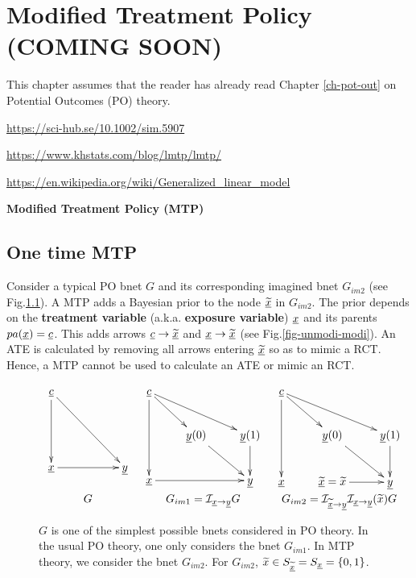 \chapter{Modified Treatment Policy (COMING SOON)}
\label{ch-modi-treat}

This  chapter
assumes that the
reader has
already read
Chapter \ref{ch-pot-out} on Potential Outcomes (PO) theory.


\url{https://sci-hub.se/10.1002/sim.5907}

\url{https://www.khstats.com/blog/lmtp/lmtp/}

\url{https://en.wikipedia.org/wiki/Generalized_linear_model}


\cite{hernan-book}

{\bf Modified Treatment Policy (MTP)}

\section{One time MTP}
Consider a typical PO bnet $G$
and its corresponding imagined bnet $G_{im2}$ (see Fig.\ref{fig-modi-po}).
A MTP adds a Bayesian prior to the
 node $\underline{{\widetilde{x}}}$ in $G_{im2}$.
The prior depends on the {\bf treatment
variable} (a.k.a. {\bf exposure variable}) ${\underline{x}}$ and its parents $pa({\underline{x}})={\underline{c}}$.
This adds arrows ${\underline{c}}\rightarrow\underline{{\widetilde{x}}}$
and ${\underline{x}}\rightarrow \underline{{\widetilde{x}}}$ (see Fig.\ref{fig-unmodi-modi}).
An ATE is calculated by removing all arrows entering $\underline{{\widetilde{x}}}$
so as to mimic a RCT. Hence, a MTP cannot be used to calculate
an ATE or mimic an RCT.


\begin{figure}[h!]
$$
\begin{array}{ccc}
\xymatrix{
\rvc
\ar[dd]\ar[ddrr]
\\
\\
\rvx \ar[rr]
&
&\rvy
}
&
\xymatrix{
\rvc
\ar[dd]\ar[dr] \ar[drr]
\\
& \rvy(0)\ar[dr]
&\rvy(1)\ar[d]
\\
\rvx\ar[rr]
&
&\rvy
}
&
\xymatrix{
\rvc
\ar[dd]\ar[dr] \ar[drr]
\\
& \rvy(0)\ar[dr]
&\rvy(1)\ar[d]
\\
\rvx
&\ul{\tilx}=\tilx\ar[r]
&\rvy
}
\\
G
&G_{im1} =\cali_{\rvx\rarrow\rvy} G
& G_{im2}=\cali_{\ul{\tilx}\rarrow\rvy}\cali_{\rvx\rarrow\rvy}(\tilx)G
\end{array}
$$
\caption{$G$ is one of the
simplest possible bnets considered in  PO theory.
In the usual PO theory,
one only considers the bnet $G_{im1}$.
In MTP theory, we
consider the bnet $G_{im2}$.
For $G_{im2}$, ${\widetilde{x}}\in S_{\underline{{\widetilde{x}}}}=S_{\underline{x}}=\{0,1\}$.
}
\label{fig-modi-po}
\end{figure}


